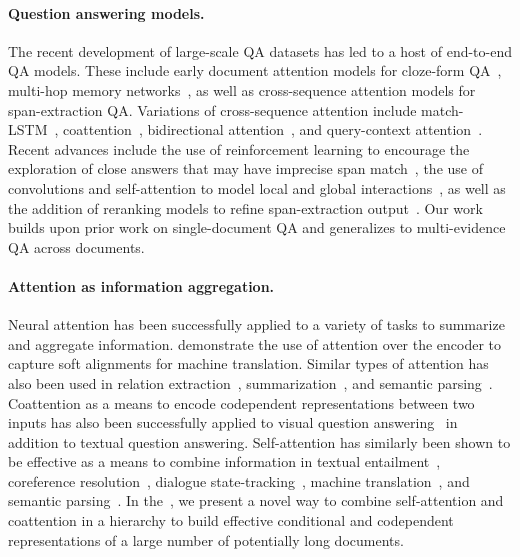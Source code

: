 \documentclass{article} \usepackage{iclr2019_conference,times}
\begin{document}
\paragraph{Question answering models.}
The recent development of large-scale QA datasets has led to a host of end-to-end QA models.
These include early document attention models for cloze-form QA~\citep{chen2016AThorough}, multi-hop memory networks~\citep{weston2015memory,sukhbaatar2015end,kumar2016ask}, as well as cross-sequence attention models for span-extraction QA.
Variations of cross-sequence attention include match-LSTM~\citep{Wang2016MachineCU}, coattention~\citep{xiong2016dynamic,xiong2018dcn}, bidirectional attention~\citep{Seo2016BidirectionalAF}, and query-context attention~\citep{wei2018QANet}.
Recent advances include the use of reinforcement learning to encourage the exploration of close answers that may have imprecise span match~\citep{xiong2018dcn,hu2018reinforced}, the use of convolutions and self-attention to model local and global interactions~\citep{wei2018QANet},
as well as the addition of reranking models to refine span-extraction output~\citep{wang2018evidence,hu2018read}.
Our work builds upon prior work on single-document QA and generalizes to multi-evidence QA across documents.

\paragraph{Attention as information aggregation.}
Neural attention has been successfully applied to a variety of tasks to summarize and aggregate information.
\citet{bahdanau2014neural} demonstrate the use of attention over the encoder to capture soft alignments for machine translation.
Similar types of attention has also been used in relation extraction~\citep{zhang2017position}, summarization~\citep{rush2015ANeural}, and semantic parsing~\citep{dong2018coarse}.
Coattention as a means to encode codependent representations between two inputs has also been successfully applied to visual question answering~\citep{Lu2016HierarchicalQC} in addition to textual question answering.
Self-attention has similarly been shown to be effective as a means to combine information in textual entailment~\citep{shen2018reinforced,yoon2018dynamic}, coreference resolution~\citep{lee2017end}, dialogue state-tracking~\citep{zhong2018global}, machine translation~\citep{Vaswani2017AttentionIA}, and semantic parsing~\citep{Klein2018constituency}.
In the~\modelnameshort, we present a novel way to combine self-attention and coattention in a hierarchy to build effective conditional and codependent representations of a large number of potentially long documents.
\end{document}
